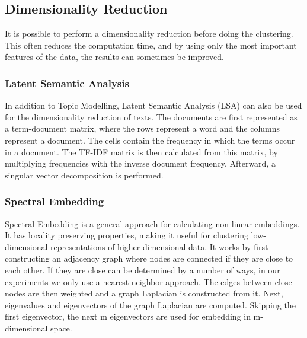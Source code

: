 \subsection{Dimensionality Reduction}
It is possible to perform a dimensionality reduction before doing the clustering.
This often reduces the computation time, and by using only the most important features of the data, the results can sometimes be improved.  

\subsubsection{Latent Semantic Analysis }
In addition to Topic Modelling, Latent Semantic Analysis (LSA) can also be used for the dimensionality reduction of texts.
The documents are first represented as a term-document matrix, where the rows represent a word and the columns represent a document.
The cells contain the frequency in which the terms occur in a document.
The TF-IDF matrix is then calculated from this matrix, by multiplying frequencies with the inverse document frequency.
Afterward, a singular vector decomposition is performed.\cite{lsa}

\subsubsection{Spectral Embedding}\label{subsubsec:spectral_embedding}
Spectral Embedding is a general approach for calculating non-linear embeddings. It has locality preserving properties\cite{spectral_embedding_paper}, making it useful for clustering low-dimensional representations of higher dimensional data.
It works by first constructing an adjacency graph where nodes are connected if they are close to each other. If they are close can be determined by a number of ways, in our experiments we only use a nearest neighbor approach. The edges between close nodes are then weighted and a graph Laplacian is constructed from it. Next, eigenvalues and eigenvectors of the graph Laplacian are computed. Skipping the first eigenvector, the next m eigenvectors are used for embedding in m-dimensional space.\cite{spectral_embedding_paper}

